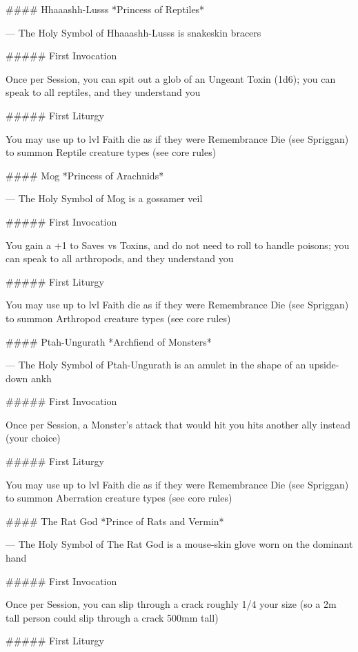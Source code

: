#### Hhaaashh-Lusss
*Princess of Reptiles*

---
The Holy Symbol of Hhaaashh-Lusss is snakeskin bracers

##### First Invocation

Once per Session, you can spit out a glob of an Ungeant Toxin (1d6); you can speak to all reptiles, and they understand you

##### First Liturgy

You may use up to {lvl} Faith die as if they were Remembrance Die (see Spriggan) to summon Reptile creature types (see core rules)





#### Mog
*Princess of Arachnids*

---
The Holy Symbol of Mog is a gossamer veil

##### First Invocation

You gain a +1 to Saves vs Toxins, and do not need to roll to handle poisons; you can speak to all arthropods,  and they understand you

##### First Liturgy

You may use up to {lvl}  Faith die as if they were Remembrance Die (see Spriggan) to summon Arthropod creature types (see core rules)




#### Ptah-Ungurath
*Archfiend of Monsters*

---
The Holy Symbol of Ptah-Ungurath is an amulet in the shape of an upside-down ankh

##### First Invocation

Once per Session, a Monster's attack that would hit you hits another ally instead (your choice)

##### First Liturgy

You may use up to {lvl} Faith die as if they were Remembrance Die (see Spriggan) to summon Aberration creature types (see core rules)




#### The Rat God
*Prince of Rats and Vermin*

---
The Holy Symbol of The Rat God is a mouse-skin glove worn on the dominant hand

##### First Invocation

Once per Session, you can slip through a crack roughly 1/4 your size (so a 2m tall person could slip through a crack 500mm tall)

##### First Liturgy

